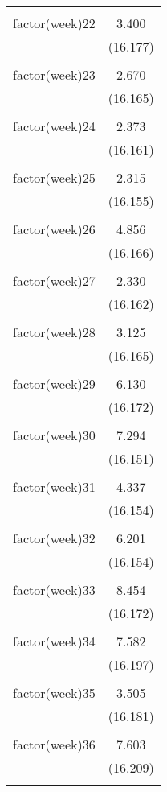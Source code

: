 \documentclass[twoside,twocolumn]{article}
\begin{document}
\begin{table}[!htbp]
\begin{tabular}{@{\extracolsep{5pt}}lc}
  & \\ 
 factor(week)22 & 3.400 \\ 
  & (16.177) \\ 
  & \\ 
 factor(week)23 & 2.670 \\ 
  & (16.165) \\ 
  & \\ 
 factor(week)24 & 2.373 \\ 
  & (16.161) \\ 
  & \\ 
 factor(week)25 & 2.315 \\ 
  & (16.155) \\ 
  & \\ 
 factor(week)26 & 4.856 \\ 
  & (16.166) \\ 
  & \\ 
 factor(week)27 & 2.330 \\ 
  & (16.162) \\ 
  & \\ 
 factor(week)28 & 3.125 \\ 
  & (16.165) \\ 
  & \\ 
 factor(week)29 & 6.130 \\ 
  & (16.172) \\ 
  & \\ 
 factor(week)30 & 7.294 \\ 
  & (16.151) \\ 
  & \\ 
 factor(week)31 & 4.337 \\ 
  & (16.154) \\ 
  & \\ 
 factor(week)32 & 6.201 \\ 
  & (16.154) \\ 
  & \\ 
 factor(week)33 & 8.454 \\ 
  & (16.172) \\ 
  & \\ 
 factor(week)34 & 7.582 \\ 
  & (16.197) \\ 
  & \\ 
 factor(week)35 & 3.505 \\ 
  & (16.181) \\ 
  & \\ 
 factor(week)36 & 7.603 \\ 
  & (16.209) \\ 
  & \\ 

\end{tabular}
\end{table}
\end{document}
